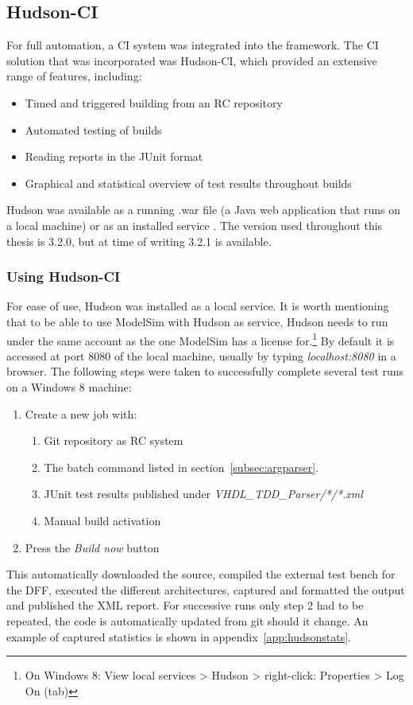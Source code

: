 \documentclass[11pt,british]{article}
\begin{document}
\subsection{Hudson-CI}
\label{subsec:Hudson}
For full automation, a \gls{CI} system was integrated into the framework. The \gls{CI} solution that was incorporated was Hudson-CI, which provided an extensive range of features, including:
\begin{itemize}%
\item Timed and triggered building from an \gls{RC} repository
\item Automated testing of builds
\item Reading reports in the JUnit format
\item Graphical and statistical overview of test results throughout builds
\end{itemize}
Hudson was available as a running .war file (a Java web application that runs on a local machine) or as an installed service \cite{hudson}. The version used throughout this thesis is 3.2.0, but at time of writing 3.2.1 is available.

\subsubsection{Using Hudson-CI}
\label{subsec:usinghud}
For ease of use, Hudson was installed as a local service. It is worth mentioning that to be able to use ModelSim with Hudson as service, Hudson needs to run under the same account as the one ModelSim has a license for.\footnote{On Windows 8: View local services > Hudson > right-click: Properties > Log On (tab)} By default it is accessed at port 8080 of the local machine, usually by typing \emph{localhost:8080} in a browser. The following steps were taken to successfully complete several test runs on a Windows 8 machine:
\begin{enumerate}
\item Create a new job with:
\begin{enumerate}
\item Git repository as RC system
\item The batch command listed in section~\ref{subsec:argparser}.
\item JUnit test results published under \emph{VHDL\_TDD\_Parser/*/*.xml}
\item Manual build activation
\end{enumerate}
\item Press the \emph{Build now} button
\end{enumerate}
This automatically downloaded the source, compiled the external test bench for the \gls{DFF}, executed the different architectures, captured and formatted the output and published the \gls{XML} report. For successive runs only step 2 had to be repeated, the code is automatically updated from git should it change. An example of captured statistics is shown in appendix~\ref{app:hudsonstats}.
\end{document}
